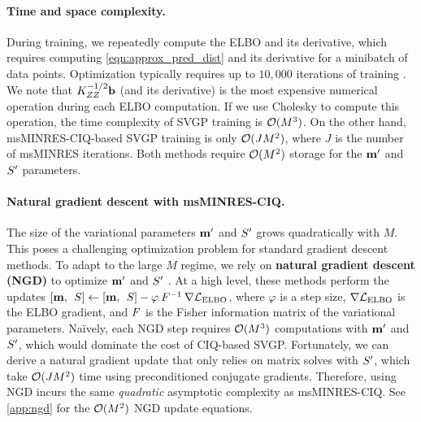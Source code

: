 \paragraph{Time and space complexity.}
During training, we repeatedly compute the ELBO and its derivative, which requires computing \cref{eqn:approx_pred_dist} and its derivative for a minibatch of data points.
Optimization typically requires up to $10,\!000$ iterations of training \citep[e.g.][]{salimbeni2018natural}.
We note that $K_{ZZ}^{-1 / 2} \mathbf{b}$ (and its derivative) is the most expensive numerical operation during each ELBO computation.
If we use Cholesky to compute this operation, the time complexity of SVGP training is $\bigo{M^3}$.
On the other hand, msMINRES-CIQ-based SVGP training is only $\bigo{J M^2}$, where $J$ is the number of msMINRES iterations.
Both methods require $\bigo{M^2}$ storage for the $\mathbf{m}'$ and $S'$ parameters.

\paragraph{Natural gradient descent with msMINRES-CIQ.}
The size of the variational parameters $\mathbf{m}'$ and $S'$ grows quadratically with $M$.
This poses a challenging optimization problem for standard gradient descent methods.
To adapt to the large $M$ regime, we rely on {\bf natural gradient descent (NGD)} to optimize $\mathbf{m}'$ and $S'$ \citep[e.g.][]{hensman2012fast,salimbeni2018natural}.
At a high level, these methods perform the updates $[\mathbf{m}, \:\: S] \gets [\mathbf{m}, \:\: S] - \varphi \: F^{-1} \: \nabla \mathcal L_\text{ELBO}$,
where $\varphi$ is a step size, $\nabla \mathcal L_\text{ELBO}$ is the ELBO gradient, and $F$ is the {Fisher information matrix} of the variational parameters.
%
Na\"ively, each NGD step requires $\bigo{M^3}$ computations with $\mathbf{m}'$ and $S'$, which would dominate the cost of CIQ-based SVGP.
Fortunately, we can derive a natural gradient update that only relies on matrix solves with $S'$, which take $\bigo{J M^2}$ time using preconditioned conjugate gradients.
Therefore, using NGD incurs the same \emph{quadratic} asymptotic complexity as msMINRES-CIQ.
See \cref{app:ngd} for the $\bigo{M^2}$ NGD update equations.

